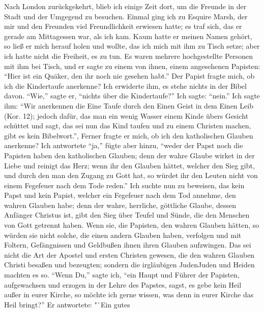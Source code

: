 Nach London zurückgekehrt, blieb ich einige Zeit dort, um die
Freunde in der Stadt und der Umgegend zu besuchen. Einmal
ging ich zu Esquire Marsh, der mir und den Freunden viel
Freundlichkeit erwiesen hatte; es traf sich, das er gerade am
Mittagessen war, als ich kam. Kaum hatte er meinen Namen
gehört, so ließ er mich herauf holen und wollte, das ich mich mit
ihm zu Tisch setze; aber ich hatte nicht die Freiheit, es zu tun.
Es waren mehrere hochgestellte Personen mit ihm bei Tisch, und
er sagte zu einem von ihnen, einem angesehenen Papisten: "`Hier
ist ein Quäker, den ihr noch nie gesehen habt."' Der Papist fragte
mich, ob ich die Kindertaufe anerkenne? Ich erwiderte ihm, es
stehe nichts in der Bibel davon. "`Wie,"' sagte er, "`nichts über
die Kindertaufe?"' Ich sagte: "`nein."' Ich sagte ihm: "`Wir
anerkennen die Eine Taufe durch den Einen Geist in dem Einen
Leib (Kor. 12); jedoch dafür, das man ein wenig Wasser einem
Kinde übers Gesicht schüttet und sagt, das sei nun das Kind taufen
und zu einem Christen machen, gibt es kein Bibelwort."', Ferner
fragte er mich, ob ich den katholischen Glauben anerkenne? Ich
antwortete "`ja,"' fügte aber hinzu, "`weder der Papst noch die
Papisten haben den katholischen Glauben; denn der wahre Glaube
wirket in der Liebe und reinigt das Herz; wenn ihr den Glauben
hättet, welcher den Sieg gibt, und durch den man den Zugang
zu Gott hat, so würdet ihr den Leuten nicht von einem Fegefeuer
nach dem Tode reden."' Ich suchte 
nun zu beweisen, das kein Papst und kein Papist, welcher ein 
Fegefeuer nach dem Tod
annehme, den wahren Glauben habe; denn der wahre, herrliche,
göttliche Glaube, dessen Anfänger Christus ist, gibt den Sieg über
Teufel und Sünde, die den Menschen von Gott getrennt haben.
Wenn sie, die Papisten, den wahren Glauben hätten, so würden
sie nicht solche, die einen andern Glauben haben, verfolgen und
mit Foltern, Gefängnissen und Geldbußen ihnen ihren Glauben
aufzwingen. Das sei nicht die Art der Apostel und ersten Christen
gewesen, die den wahren Glauben Christi besaßen und bezeugten;
sondern die irgläubigen Juden\indexname{Juden} und Heiden machten es so. "`Wenn
Du,"' sagte ich, "`ein Haupt und Führer der Papisten, 
aufgewachsen und erzogen in der Lehre des Papstes, sagst, es gebe kein
Heil außer in eurer Kirche, so möchte ich gerne wissen, was denn
in eurer Kirche das Heil bringt?"' Er antwortete: "`Ein gutes

